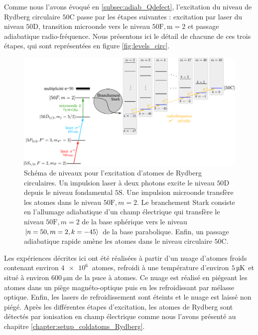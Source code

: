 \noindent Comme nous l'avons évoqué en \ref{subsec:adiab_Qdefect}, l'excitation du niveau de Rydberg circulaire $\mathrm{50C}$ passe par les étapes suivantes : excitation par laser du niveau $\mathrm{50D}$, transition microonde vers le niveau $\mathrm{50F,m=2}$ et passage adiabatique radio-fréquence.
Nous présentons ici le détail de chacune de ces trois étapes, qui sont représentées en figure \eqref{fig:levels_circ}.

\begin{figure}[h]
\centering
\includegraphics[width=\linewidth]{figures/circulars/level_scheme_5S50C}
\caption[Schéma de niveaux pour l'excitation d'atomes de Rydberg circulaires]
{Schéma de niveaux pour l'excitation d'atomes de Rydberg circulaires.
Un impulsion laser à deux photons excite le niveau $\mathrm{50D}$ depuis le niveau fondamental $\mathrm{5S}$.
Une impulsion microonde transfère les atomes dans le niveau $\mathrm{50F},m=2$.
Le branchement Stark consiste en l'allumage adiabatique d'un champ électrique qui transfère le niveau $\mathrm{50F},m=2$ de la base sphérique vers le niveau $\ket{n=50,m=2,k=-45}$ de la base parabolique.
Enfin, un passage adiabatique rapide amène les atomes dans le niveau circulaire $\mathrm{50C}$.
}\label{fig:levels_circ}
\end{figure}

Les expériences décrites ici ont été réalisées à partir d'un nuage d'atomes froids contenant environ $\SI{4e6}{}$ atomes, refroidi à une température d'environ $\SI{5}{\si{\micro\kelvin}}$ et situé à environ $\SI{600}{\um}$ de la puce à atomes.
Ce nuage est réalisé en piégeant les atomes dans un piège magnéto-optique puis en les refroidissant par mélasse optique.
Enfin, les lasers de refroidissement sont éteints et le nuage est laissé non piégé.
Après les différentes étapes d'excitation, les atomes de Rydberg sont détectés par ionisation en champ électrique comme nous l'avons présenté au chapitre \ref{chapter:setup_coldatoms_Rydberg}.

